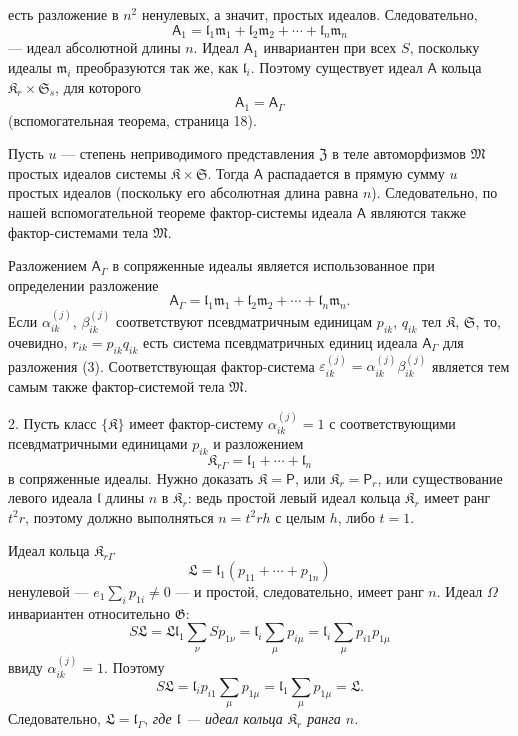 \documentclass[11pt]{article}
\begin{document}
есть разложение в \(n^2\) ненулевых, а значит, простых идеалов. Следовательно,
\[
\mathsf{A}_1=\mathfrak l_1\mathfrak m_1+\mathfrak l_2\mathfrak m_2+\cdots+\mathfrak l_n\mathfrak m_n
\]
--- идеал абсолютной длины \(n\). Идеал \(\mathsf{A}_1\) инвариантен при всех \(S\), поскольку идеалы \(\mathfrak m_i\) преобразуются так же, как \(\mathfrak l_i\). Поэтому существует идеал \(\mathsf{A}\) кольца \(\mathfrak K_r\times\mathfrak S_s\), для которого
\[
\mathsf{A}_1=\mathsf{A}_\Gamma
\]
(вспомогательная теорема, страница 18).

Пусть \(u\) --- степень неприводимого представления \(\mathfrak Z\) в теле автоморфизмов \(\mathfrak M\) простых идеалов системы \(\mathfrak K\times\mathfrak S\). Тогда \(\mathsf{A}\) распадается в прямую сумму \(u\) простых идеалов (поскольку его абсолютная длина равна \(n\)). Следовательно, по нашей вспомогательной теореме фактор-системы идеала \(\mathsf{A}\) являются также фактор-системами тела \(\mathfrak M\).

Разложением \(\mathsf{A}_\Gamma\) в сопряженные идеалы является использованное при определении разложение
\[
\tag{3}
\mathsf{A}_\Gamma=\mathfrak l_1\mathfrak m_1+\mathfrak l_2\mathfrak m_2+\cdots+\mathfrak l_n\mathfrak m_n.
\]
Если \(\alpha_{ik}^{(j)}\), \(\beta_{ik}^{(j)}\) соответствуют псевдматричным единицам \(p_{ik}\), \(q_{ik}\) тел \(\mathfrak K\), \(\mathfrak S\), то, очевидно, \(r_{ik}=p_{ik}q_{ik}\) есть система псевдматричных единиц идеала \(\mathsf{A}_\Gamma\) для разложения (3). Соответствующая фактор-система \(\varepsilon_{ik}^{(j)}=\alpha_{ik}^{(j)}\beta_{ik}^{(j)}\) является тем самым также фактор-системой тела \(\mathfrak M\).

2. Пусть класс \(\{\mathfrak K\}\) имеет фактор-систему \(\alpha_{ik}^{(j)}=1\) с соответствующими псевдматричными единицами \(p_{ik}\) и разложением
\[
\mathfrak K_{r\Gamma}=\mathfrak l_1+\cdots+\mathfrak l_n
\]
в сопряженные идеалы. Нужно доказать \(\mathfrak K=\mathsf P\), или \(\mathfrak K_r=\mathsf P_r\), или существование левого идеала \(\mathfrak l\) длины \(n\) в \(\mathfrak K_r\): ведь простой левый идеал кольца \(\mathfrak K_r\) имеет ранг \(t^2r\), поэтому должно выполняться \(n=t^2rh\) с целым \(h\), либо \(t=1\).

Идеал кольца \(\mathfrak K_{r\Gamma}\)
\[
\mathfrak L=\mathfrak l_1(p_{11}+\cdots+p_{1n})
\]
ненулевой --- \(e_1\sum_i p_{1i}\ne0\) --- и простой, следовательно, имеет ранг \(n\). Идеал \(\Omega\) инвариантен относительно \(\mathfrak G\):
\[
S\mathfrak L
=\mathfrak L\mathfrak l_1\sum_\nu S p_{1\nu}
=\mathfrak l_i\sum_\mu p_{i\mu}
=\mathfrak l_i\sum_\mu p_{i1}p_{1\mu}
\]
ввиду \(\alpha_{ik}^{(j)}=1\). Поэтому
\[
S\mathfrak L=\mathfrak l_ip_{i1}\sum_\mu p_{1\mu}
=\mathfrak l_1\sum_\mu p_{1\mu}
=\mathfrak L.
\]
Следовательно, \(\mathfrak L=\mathfrak l_\Gamma\), \emph{где \(\mathfrak l\) --- идеал кольца \(\mathfrak K_r\) ранга \(n\).}
\end{document}
